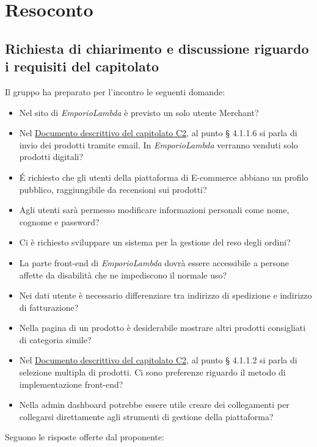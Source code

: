 \section{Resoconto}
\subsection{Richiesta di chiarimento e discussione riguardo i requisiti del capitolato}
Il gruppo ha preparato per l'incontro le seguenti domande:
\begin{itemize}
\item Nel sito di \textit{EmporioLambda} è previsto un solo utente Merchant?
\item Nel \href{https://www.math.unipd.it/~tullio/IS-1/2020/Progetto/C2.pdf}{Documento descrittivo del capitolato C2}, al punto § 4.1.1.6 si parla di invio dei prodotti tramite email. In \textit{EmporioLambda} verranno venduti solo prodotti digitali?
\item É richiesto che gli utenti della piattaforma di E-commerce abbiano un profilo pubblico, raggiungibile da recensioni sui prodotti?
\item Agli utenti sarà permesso modificare informazioni personali come nome, cognome e password?
\item Ci è richiesto sviluppare un sistema per la gestione del reso degli ordini?
\item La parte front-end di \textit{EmporioLambda} dovrà essere accessibile a persone affette da disabilità che ne impediscono il normale uso?
\item Nei dati utente è necessario differenziare tra indirizzo di spedizione e indirizzo di fatturazione?
\item Nella pagina di un prodotto è desiderabile mostrare altri prodotti consigliati di categoria simile?
\item Nel \href{https://www.math.unipd.it/~tullio/IS-1/2020/Progetto/C2.pdf}{Documento descrittivo del capitolato C2}, al punto § 4.1.1.2 si parla di selezione multipla di prodotti. Ci sono preferenze riguardo il metodo di implementazione front-end?
\item Nella admin dashboard potrebbe essere utile creare dei collegamenti per collegarsi direttamente agli strumenti di gestione della piattaforma?
\end{itemize}
Seguono le risposte offerte dal proponente:
